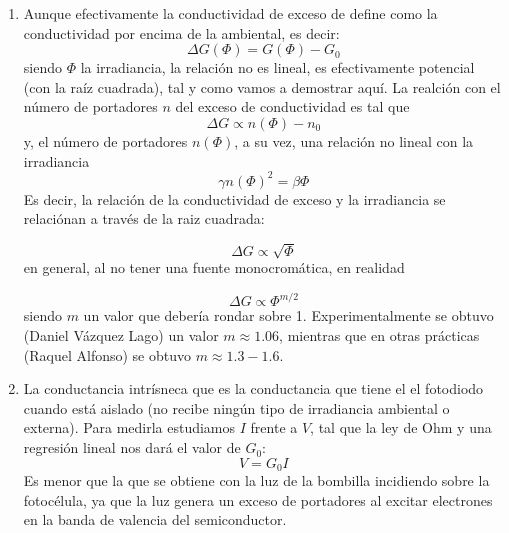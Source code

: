 \begin{enumerate}[label=\alph*)]
	\item Aunque efectivamente la conductividad de exceso de define como la conductividad por encima de la ambiental, es decir:
	      \begin{equation*}
		      \Delta G (\Phi) = G(\Phi)  - G_0
	      \end{equation*}
	      siendo $\Phi$ la irradiancia, la relación no es lineal, es efectivamente potencial (con la raíz cuadrada), tal y como vamos a demostrar aquí. La realción con el número de portadores $n$ del exceso de conductividad es tal que
	      \begin{equation*}
		      \Delta G \propto n(\Phi) - n_0
	      \end{equation*}
	      y, el número de portadores $n(\Phi)$, a su vez, una relación no lineal con la irradiancia
	      \begin{equation*}
		      \gamma n(\Phi)^2 = \beta  \Phi
	      \end{equation*}
	      Es decir, la relación de la conductividad de exceso y la irradiancia se relaciónan a través de la raiz cuadrada:

	      \begin{equation*}
		      \Delta G \propto \sqrt{\Phi}
	      \end{equation*}
	      en general, al no tener una fuente monocromática, en realidad

	      \begin{equation*}
		      \Delta G \propto \Phi^{m/2}
	      \end{equation*}
	      siendo $m$ un valor que debería rondar sobre 1. Experimentalmente se obtuvo (Daniel Vázquez Lago) un valor $m\approx 1.06$, mientras que en otras prácticas (Raquel Alfonso) se obtuvo $m\approx 1.3-1.6$.

	\item La conductancia intrísneca que es la conductancia que tiene el el fotodiodo cuando está aislado (no recibe ningún tipo de irradiancia ambiental o externa). Para medirla estudiamos $I$ frente a $V$, tal que la ley de Ohm y una regresión lineal nos dará el valor de $G_0$:
	      \begin{equation*}
		      V = G_0 I
	      \end{equation*}
	      Es menor que la que se obtiene con la luz de la bombilla incidiendo sobre la fotocélula, ya que la luz genera un exceso de portadores al excitar electrones en la banda de valencia del semiconductor.
\end{enumerate}

